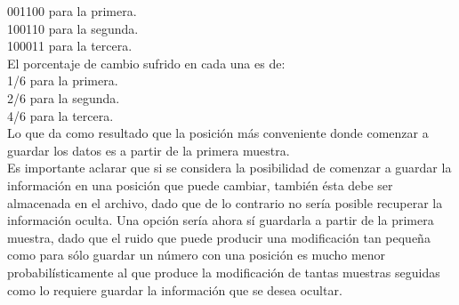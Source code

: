 \documentclass{article}
\begin{document}
001100 para la primera.\\
100110 para la segunda.\\
100011 para la tercera.\\
El porcentaje de cambio sufrido en cada una es de: \\
1/6 para la primera.\\
2/6 para la segunda.\\
4/6 para la tercera.\\
Lo que da como resultado que la posición más conveniente donde comenzar a guardar los datos es a partir de la primera muestra.\\
Es importante aclarar que si se considera la posibilidad de comenzar a guardar la información en una posición que puede cambiar, también ésta debe ser almacenada en el archivo, dado que de lo contrario no sería posible recuperar la información oculta. Una opción sería ahora sí guardarla a partir de la primera muestra, dado que el ruido que puede producir una modificación tan pequeña como para sólo guardar un número con una posición es mucho menor probabilísticamente al que produce la modificación de tantas muestras seguidas como lo requiere guardar la información que se desea ocultar.
\end{document}

